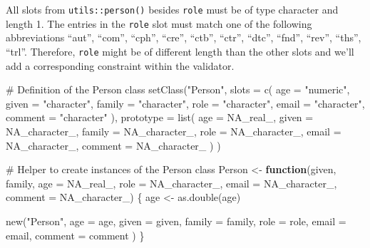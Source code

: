 \documentclass[
]{krantz}
\makeatletter
\newenvironment{Shaded}{\begin{snugshade}}{\end{snugshade}}
\newcommand{\CommentTok}[1]{\textcolor[rgb]{0.56,0.35,0.01}{\textit{#1}}}
\newcommand{\ControlFlowTok}[1]{\textcolor[rgb]{0.13,0.29,0.53}{\textbf{#1}}}
\newcommand{\DataTypeTok}[1]{\textcolor[rgb]{0.13,0.29,0.53}{#1}}
\newcommand{\KeywordTok}[1]{\textcolor[rgb]{0.13,0.29,0.53}{\textbf{#1}}}
\newcommand{\NormalTok}[1]{#1}
\newcommand{\OtherTok}[1]{\textcolor[rgb]{0.56,0.35,0.01}{#1}}
\newcommand{\StringTok}[1]{\textcolor[rgb]{0.31,0.60,0.02}{#1}}
\newenvironment{kframe}{%
\medskip{}
\setlength{\fboxsep}{.8em}
 \def\at@end@of@kframe{}%
 \ifinner\ifhmode%
  \def\at@end@of@kframe{\end{minipage}}%
  \begin{minipage}{\columnwidth}%
 \fi\fi%
 \def\FrameCommand##1{\hskip\@totalleftmargin \hskip-\fboxsep
 \colorbox{shadecolor}{##1}\hskip-\fboxsep
     \hskip-\linewidth \hskip-\@totalleftmargin \hskip\columnwidth}%
 \MakeFramed {\advance\hsize-\width
   \@totalleftmargin\z@ \linewidth\hsize
   \@setminipage}}%
 {\par\unskip\endMakeFramed%
 \at@end@of@kframe}
\renewenvironment{Shaded}{\begin{kframe}}{\end{kframe}}
\renewcommand{\KeywordTok} [1]{\textcolor[rgb]{0.00,0.44,0.13}{{#1}}}
\renewcommand{\DataTypeTok}[1]{\textcolor[rgb]{0.56,0.13,0.00}{{#1}}}
\renewcommand{\StringTok}  [1]{\textcolor[rgb]{0.25,0.44,0.63}{{#1}}}
\renewcommand{\CommentTok} [1]{\textcolor[rgb]{0.38,0.63,0.69}{{#1}}}
\renewcommand{\OtherTok}   [1]{\textcolor[rgb]{0.00,0.44,0.13}{{#1}}}
\renewcommand{\NormalTok}  [1]{{#1}}
\makeatother
\begin{document}
All slots from \texttt{utils::person()} besides \texttt{role} must be of type character and length 1. The entries in the \texttt{role} slot must match one of the following abbreviations ``aut'', ``com'', ``cph'', ``cre'', ``ctb'', ``ctr'', ``dtc'', ``fnd'', ``rev'', ``ths'', ``trl''. Therefore, \texttt{role} might be of different length than the other slots and we'll add a corresponding constraint within the validator.

\begin{Shaded}
\begin{Highlighting}[]
\CommentTok{# Definition of the Person class}
\KeywordTok{setClass}\NormalTok{(}\StringTok{"Person"}\NormalTok{,}
  \DataTypeTok{slots =} \KeywordTok{c}\NormalTok{(}
    \DataTypeTok{age =} \StringTok{"numeric"}\NormalTok{,}
    \DataTypeTok{given =} \StringTok{"character"}\NormalTok{,}
    \DataTypeTok{family =} \StringTok{"character"}\NormalTok{,}
    \DataTypeTok{role =} \StringTok{"character"}\NormalTok{,}
    \DataTypeTok{email =} \StringTok{"character"}\NormalTok{,}
    \DataTypeTok{comment =} \StringTok{"character"}
\NormalTok{  ),}
  \DataTypeTok{prototype =} \KeywordTok{list}\NormalTok{(}
    \DataTypeTok{age =} \OtherTok{NA_real_}\NormalTok{,}
    \DataTypeTok{given =} \OtherTok{NA_character_}\NormalTok{,}
    \DataTypeTok{family =} \OtherTok{NA_character_}\NormalTok{,}
    \DataTypeTok{role =} \OtherTok{NA_character_}\NormalTok{,}
    \DataTypeTok{email =} \OtherTok{NA_character_}\NormalTok{,}
    \DataTypeTok{comment =} \OtherTok{NA_character_}
\NormalTok{  )}
\NormalTok{)}

\CommentTok{# Helper to create instances of the Person class}
\NormalTok{Person <-}\StringTok{ }\ControlFlowTok{function}\NormalTok{(given, family,}
                   \DataTypeTok{age =} \OtherTok{NA_real_}\NormalTok{,}
                   \DataTypeTok{role =} \OtherTok{NA_character_}\NormalTok{,}
                   \DataTypeTok{email =} \OtherTok{NA_character_}\NormalTok{,}
                   \DataTypeTok{comment =} \OtherTok{NA_character_}\NormalTok{) \{}
\NormalTok{  age <-}\StringTok{ }\KeywordTok{as.double}\NormalTok{(age)}

  \KeywordTok{new}\NormalTok{(}\StringTok{"Person"}\NormalTok{,}
    \DataTypeTok{age =}\NormalTok{ age,}
    \DataTypeTok{given =}\NormalTok{ given,}
    \DataTypeTok{family =}\NormalTok{ family,}
    \DataTypeTok{role =}\NormalTok{ role,}
    \DataTypeTok{email =}\NormalTok{ email,}
    \DataTypeTok{comment =}\NormalTok{ comment}
\NormalTok{  )}
\NormalTok{\}}


\end{Highlighting}
\end{Shaded}
\end{document}
